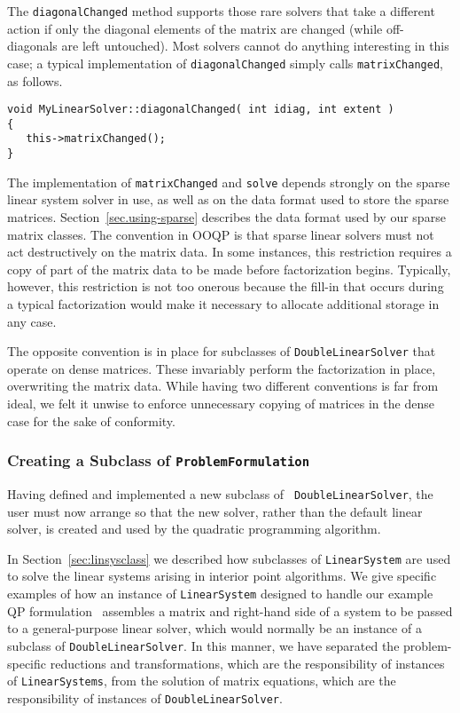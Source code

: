 The \texttt{diagonalChanged} method supports those rare solvers that
take a different action if only the diagonal elements of the matrix
are changed (while off-diagonals are left untouched). Most solvers
cannot do anything interesting in this case; a typical implementation
of \texttt{diagonalChanged} simply calls \texttt{matrixChanged}, as
follows.
\begin{verbatim}
void MyLinearSolver::diagonalChanged( int idiag, int extent )
{
   this->matrixChanged();
}
\end{verbatim}

The implementation of \texttt{matrixChanged} and \texttt{solve}
depends strongly on the sparse linear system solver in use, as well as
on the data format used to store the sparse matrices.
Section~\ref{sec.using-sparse} describes the data format used by our
sparse matrix classes. The convention in OOQP is that sparse linear
solvers must not act destructively on the matrix data.  In some
instances, this restriction requires a copy of part of the matrix data
to be made before factorization begins. Typically, however, this
restriction is not too onerous because the fill-in that occurs during
a typical factorization would make it necessary to allocate additional
storage in any case.

The opposite convention is in place for subclasses of
\texttt{DoubleLinearSolver} that operate on dense matrices. These
invariably perform the factorization in place, overwriting the matrix
data. While having two different conventions is far from ideal, we
felt it unwise to enforce unnecessary copying of matrices in the dense
case for the sake of conformity.

\subsubsection{Creating a Subclass of {\tt ProblemFormulation}}
\label{sec.subclass.ProblemFormulation}

Having defined and implemented a new subclass of {\tt
  DoubleLinearSolver}, the user must now arrange so that the new
solver, rather than the default linear solver, is created and used by
the quadratic programming algorithm. 


In Section~\ref{sec:linsysclass} we described how subclasses of
\texttt{LinearSystem} are used to solve the linear systems arising in
interior point algorithms. We give specific examples of how an
instance of \texttt{LinearSystem} designed to handle our example QP
formulation~ assembles a matrix and right-hand side of a
system to be passed to a general-purpose linear solver, which would
normally be an instance of a subclass of
\texttt{DoubleLinearSolver}. In this manner, we have separated the
problem-specific reductions and transformations, which are the
responsibility of instances of \texttt{LinearSystems}, from the
solution of matrix equations, which are the responsibility of
instances of \texttt{DoubleLinearSolver}.

